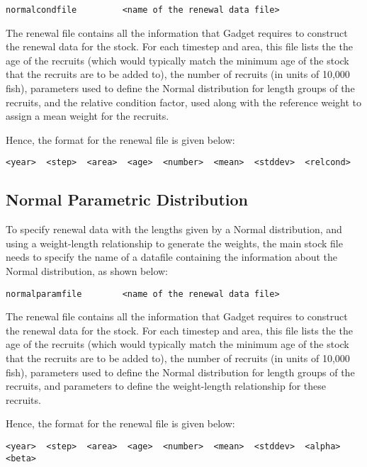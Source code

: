 \documentclass[10pt,twoside]{book}
\begin{document}
{\small\begin{verbatim}
normalcondfile         <name of the renewal data file>
\end{verbatim}}

The renewal file contains all the information that Gadget requires to construct the renewal data for the stock.  For each timestep and area, this file lists the the age of the recruits (which would typically match the minimum age of the stock that the recruits are to be added to), the number of recruits (in units of 10,000 fish), parameters used to define the Normal distribution for length groups of the recruits, and the relative condition factor, used along with the reference weight to assign a mean weight for the recruits.

\bigskip
Hence, the format for the renewal file is given below:

{\small\begin{verbatim}
<year>  <step>  <area>  <age>  <number>  <mean>  <stddev>  <relcond>
\end{verbatim}}

\subsection{Normal Parametric Distribution}
To specify renewal data with the lengths given by a Normal distribution, and using a weight-length relationship to generate the weights, the main stock file needs to specify the name of a datafile containing the information about the Normal distribution, as shown below:

{\small\begin{verbatim}
normalparamfile        <name of the renewal data file>
\end{verbatim}}

The renewal file contains all the information that Gadget requires to construct the renewal data for the stock.  For each timestep and area, this file lists the the age of the recruits (which would typically match the minimum age of the stock that the recruits are to be added to), the number of recruits (in units of 10,000 fish), parameters used to define the Normal distribution for length groups of the recruits, and parameters to define the weight-length relationship for these recruits.

\bigskip
Hence, the format for the renewal file is given below:

{\small\begin{verbatim}
<year>  <step>  <area>  <age>  <number>  <mean>  <stddev>  <alpha>  <beta>
\end{verbatim}}
\end{document}
